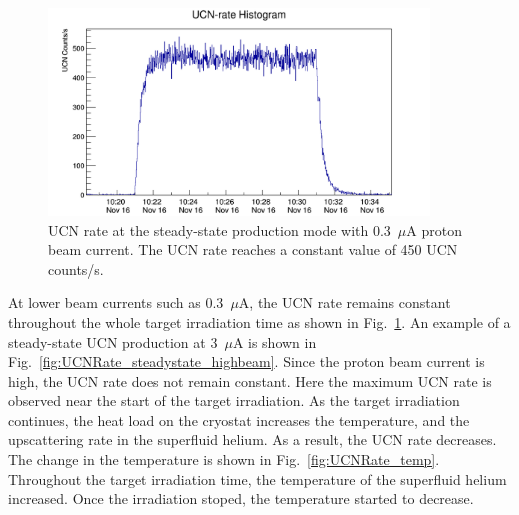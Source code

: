 \begin{figure}[h!]
  \centering
  \includegraphics[width=0.9\textwidth]{steadystate_point3muA.png}
  \caption[Steady-state UCN rate at 0.3~$\mu$A beam current]{UCN rate at the
    steady-state production mode with 0.3~$\mu$A proton beam
    current. The UCN rate reaches a constant value of 450 UCN
    counts/s.}
  \label{fig:UCNRate_steadystate}
\end{figure}

At lower beam currents such as 0.3~$\mu$A, the UCN rate remains
constant throughout the whole target irradiation time as shown in
Fig.~\ref{fig:UCNRate_steadystate}. An example of a steady-state UCN
production at 3~$\mu$A is shown in
Fig.~\ref{fig:UCNRate_steadystate_highbeam}. Since the proton beam
current is high, the UCN rate does not remain constant. Here the
maximum UCN rate is observed near the start of the target
irradiation. As the target irradiation continues, the heat load on the
cryostat increases the temperature, and the upscattering rate in the
superfluid helium. As a result, the UCN rate decreases. The change in
the temperature is shown in Fig.~\ref{fig:UCNRate_temp}. Throughout
the target irradiation time, the temperature of the superfluid helium
increased. Once the irradiation stoped, the temperature started to
decrease.


